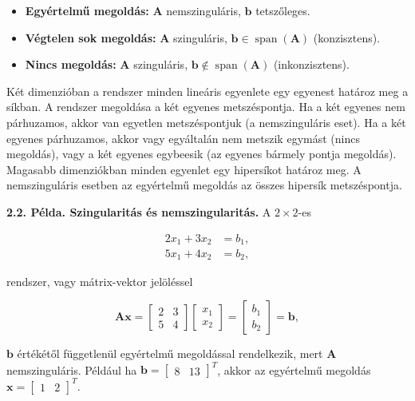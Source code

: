 \documentclass[
  magyar,
  11pt]{article}
\providecommand{\tightlist}{%
  \setlength{\itemsep}{0pt}\setlength{\parskip}{0pt}}
\providecommand{\boldsymbol}[1]{\mathbf{#1}}
\begin{document}
\begin{itemize}
\tightlist
\item
  \textbf{Egyértelmű megoldás:} \(\boldsymbol{A}\) nemszinguláris,
  \(\boldsymbol{b}\) tetszőleges.
\item
  \textbf{Végtelen sok megoldás:} \(\boldsymbol{A}\) szinguláris,
  \(\boldsymbol{b} \in \operatorname{span}(\boldsymbol{A})\)
  (konzisztens).
\item
  \textbf{Nincs megoldás:} \(\boldsymbol{A}\) szinguláris,
  \(\boldsymbol{b} \notin \operatorname{span}(\boldsymbol{A})\)
  (inkonzisztens).
\end{itemize}

Két dimenzióban a rendszer minden lineáris egyenlete egy egyenest
határoz meg a síkban. A rendszer megoldása a két egyenes metszéspontja.
Ha a két egyenes nem párhuzamos, akkor van egyetlen metszéspontjuk (a
nemszinguláris eset). Ha a két egyenes párhuzamos, akkor vagy egyáltalán
nem metszik egymást (nincs megoldás), vagy a két egyenes egybeesik (az
egyenes bármely pontja megoldás). Magasabb dimenziókban minden egyenlet
egy hipersíkot határoz meg. A nemszinguláris esetben az egyértelmű
megoldás az összes hipersík metszéspontja.

\textbf{2.2. Példa. Szingularitás és nemszingularitás.} A
\(2 \times 2\)-es

\[\begin{aligned}
2x_1 + 3x_2 &= b_1, \\
5x_1 + 4x_2 &= b_2,
\end{aligned}\]

rendszer, vagy mátrix-vektor jelöléssel

\[\boldsymbol{A}\boldsymbol{x} = \begin{bmatrix} 2 & 3 \\ 5 & 4 \end{bmatrix} \begin{bmatrix} x_1 \\ x_2 \end{bmatrix} = \begin{bmatrix} b_1 \\ b_2 \end{bmatrix} = \boldsymbol{b},\]

\(\boldsymbol{b}\) értékétől függetlenül egyértelmű megoldással
rendelkezik, mert \(\boldsymbol{A}\) nemszinguláris. Például ha
\(\boldsymbol{b} = \begin{bmatrix} 8 & 13 \end{bmatrix}^T\), akkor az
egyértelmű megoldás
\(\boldsymbol{x} = \begin{bmatrix} 1 & 2 \end{bmatrix}^T\).
\end{document}
